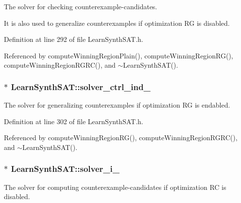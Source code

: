 The solver for checking counterexample-\/candidates. 

It is also used to generalize counterexamples if optimization R\-G is disabled. 

Definition at line 292 of file Learn\-Synth\-S\-A\-T.\-h.



Referenced by compute\-Winning\-Region\-Plain(), compute\-Winning\-Region\-R\-G(), compute\-Winning\-Region\-R\-G\-R\-C(), and $\sim$\-Learn\-Synth\-S\-A\-T().

\hypertarget{classLearnSynthSAT_ab81d5f53e078238feb1e948a5a5366ff}{
\subsubsection[{solver\-\_\-ctrl\-\_\-ind\-\_\-}]{$\ast$ Learn\-Synth\-S\-A\-T\-::solver\-\_\-ctrl\-\_\-ind\-\_\-\hspace{0.3cm}{\ttfamily [protected]}}}\label{classLearnSynthSAT_ab81d5f53e078238feb1e948a5a5366ff}


The solver for generalizing counterexamples if optimization R\-G is endabled. 



Definition at line 302 of file Learn\-Synth\-S\-A\-T.\-h.



Referenced by compute\-Winning\-Region\-R\-G(), compute\-Winning\-Region\-R\-G\-R\-C(), and $\sim$\-Learn\-Synth\-S\-A\-T().

\hypertarget{classLearnSynthSAT_a97e5c03d47cb7f237104472972b12c1c}{
\subsubsection[{solver\-\_\-i\-\_\-}]{$\ast$ Learn\-Synth\-S\-A\-T\-::solver\-\_\-i\-\_\-\hspace{0.3cm}{\ttfamily [protected]}}}\label{classLearnSynthSAT_a97e5c03d47cb7f237104472972b12c1c}


The solver for computing counterexample-\/candidates if optimization R\-C is disabled. 



